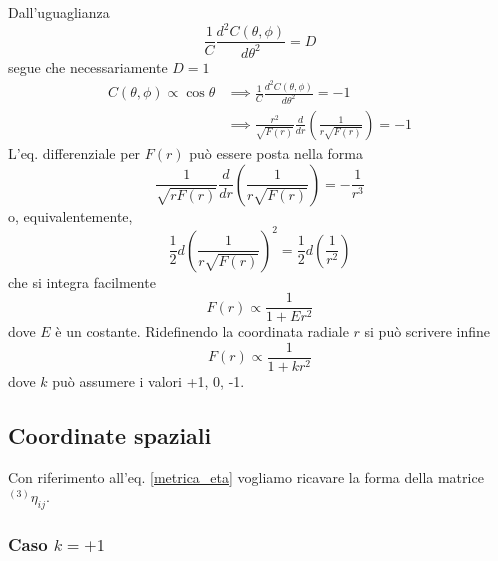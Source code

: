 Dall'uguaglianza
\begin{equation}
  \frac{1}{C} \frac{d^2 C(\theta,\phi)}{d \theta^2} = D
\end{equation}
segue che necessariamente $D=1$
\begin{equation}
  \begin{split}
    C(\theta,\phi) \propto \cos \theta & \implies
    \frac{1}{C} \frac{d^2 C(\theta,\phi)}{d \theta^2} = -1 \\
    & \implies
    \frac{r^2}{\sqrt{ F(r)}} \frac{d}{dr} \left( \frac{1}{r \sqrt{F(r)}}\right)=
    -1
  \end{split}
\end{equation}
L'eq. differenziale per $F(r)$ può essere posta nella forma
\begin{equation}
  \frac{1}{\sqrt{ r F(r)}} \frac{d}{dr} \left( \frac{1}{r \sqrt{F(r)}}\right)= -
  \frac{1}{r^3}
\end{equation}
o, equivalentemente,
\begin{equation}
  \frac{1}{2} d \left( \frac{1}{r \sqrt{F(r)}} \right)^2 =
  \frac{1}{2} d \left(\frac{1}{r^2}\right)
\end{equation}
che si integra facilmente
\begin{equation}
  F(r) \propto \frac{1}{1+E r^2}
\end{equation}
dove $E$ è un costante.  Ridefinendo la coordinata radiale $r$ si può scrivere
infine
\begin{equation}
  F(r) \propto \frac{1}{1+k r^2}
\end{equation}
dove $k$ può assumere i valori +1, 0, -1.

\subsection{Coordinate spaziali}

Con riferimento all'eq. \eqref{metrica_eta} vogliamo ricavare la forma della
matrice $^{(3)}\eta_{ij}$.

\subsubsection{Caso $k=+1$}

